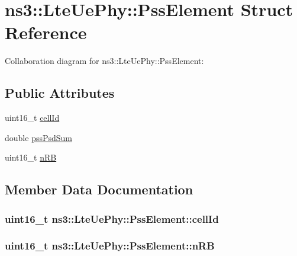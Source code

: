 \hypertarget{structns3_1_1LteUePhy_1_1PssElement}{}\section{ns3\+:\+:Lte\+Ue\+Phy\+:\+:Pss\+Element Struct Reference}
\label{structns3_1_1LteUePhy_1_1PssElement}


Collaboration diagram for ns3\+:\+:Lte\+Ue\+Phy\+:\+:Pss\+Element\+:
\subsection*{Public Attributes}
\begin{DoxyCompactItemize}
\item 
uint16\+\_\+t \hyperlink{structns3_1_1LteUePhy_1_1PssElement_a1d111192ac2625658ecbc11c5d8e422a}{cell\+Id}
\item 
double \hyperlink{structns3_1_1LteUePhy_1_1PssElement_a587f24d8a712b341a86a9b35d9a13956}{pss\+Psd\+Sum}
\item 
uint16\+\_\+t \hyperlink{structns3_1_1LteUePhy_1_1PssElement_ab5f6dd3985c2d38675bac8a5265c3ef0}{n\+RB}
\end{DoxyCompactItemize}


\subsection{Member Data Documentation}
\subsubsection[{\texorpdfstring{cell\+Id}{cellId}}]{\setlength{\rightskip}{0pt plus 5cm}uint16\+\_\+t ns3\+::\+Lte\+Ue\+Phy\+::\+Pss\+Element\+::cell\+Id}\hypertarget{structns3_1_1LteUePhy_1_1PssElement_a1d111192ac2625658ecbc11c5d8e422a}{}\label{structns3_1_1LteUePhy_1_1PssElement_a1d111192ac2625658ecbc11c5d8e422a}
\subsubsection[{\texorpdfstring{n\+RB}{nRB}}]{\setlength{\rightskip}{0pt plus 5cm}uint16\+\_\+t ns3\+::\+Lte\+Ue\+Phy\+::\+Pss\+Element\+::n\+RB}\hypertarget{structns3_1_1LteUePhy_1_1PssElement_ab5f6dd3985c2d38675bac8a5265c3ef0}{}\label{structns3_1_1LteUePhy_1_1PssElement_ab5f6dd3985c2d38675bac8a5265c3ef0}
